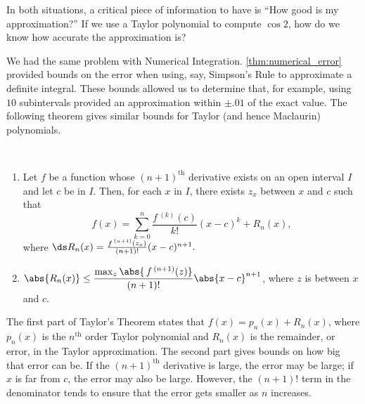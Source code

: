 	
In both situations, a critical piece of information to have is ``How good is my approximation?'' If we use a Taylor polynomial to compute $\cos 2$, how do we know how accurate the approximation is? 

We had the same problem with Numerical Integration. \autoref{thm:numerical_error} provided bounds on the error when using, say, Simpson's Rule to approximate a definite integral. These bounds allowed us to determine that, for example, using $10$ subintervals provided an approximation within $\pm .01$ of the exact value. The following theorem gives similar bounds for Taylor (and hence Maclaurin) polynomials.

{
\begin{theorem}\label{thm:taylorthm}
\mbox{}\\[-2\baselineskip]
\begin{enumerate}
	\item	Let $f$ be a function whose $(n+1)^{\text{th}}$ derivative exists on an open interval $I$ and let $c$ be in $I$. Then, for each $x$ in $I$, there exists $z_x$ between $x$ and $c$ such that\vspace{-.3\baselineskip}
\[f(x) = \sum_{k=0}^n\frac{f\,^{(k)}(c)}{k!}(x-c)^k+R_n(x),\]
where $\ds R_n(x) = \frac{f\,^{(n+1)}(z_x)}{(n+1)!}(x-c)^{n+1}.$
	\item	$\abs{R_n(x)}\leq\dfrac{\max_z\abs{\,f\,^{(n+1)}(z)}}{(n+1)!}\abs{x-c}^{n+1}$, where $z$ is between $x$ and $c$.
\end{enumerate}
\end{theorem}}

The first part of Taylor's Theorem states that $f(x) = p_n(x) + R_n(x)$, where $p_n(x)$ is the $n^\text{th}$ order Taylor polynomial and $R_n(x)$ is the remainder, or error, in the Taylor approximation. The second part gives bounds on how big that error can be. If the $(n+1)^\text{th}$ derivative is large, the error may be large; if $x$ is far from $c$, the error may also be large. However, the $(n+1)!$ term in the denominator tends to ensure that the error gets smaller as $n$ increases.

